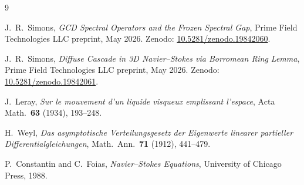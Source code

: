 \documentclass[12pt]{amsart}
\theoremstyle{definition}
\begin{document}
\begin{thebibliography}{9}

J.~R.~Simons,
\textit{GCD Spectral Operators and the Frozen Spectral Gap},
Prime Field Technologies LLC preprint, May 2026.
Zenodo: \href{https://doi.org/10.5281/zenodo.19842060}{10.5281/zenodo.19842060}.

J.~R.~Simons,
\textit{Diffuse Cascade in 3D Navier--Stokes via Borromean Ring Lemma},
Prime Field Technologies LLC preprint, May 2026.
Zenodo: \href{https://doi.org/10.5281/zenodo.19842061}{10.5281/zenodo.19842061}.

J.~Leray,
\textit{Sur le mouvement d'un liquide visqueux emplissant l'espace},
Acta Math.\ \textbf{63} (1934), 193--248.

H.~Weyl,
\textit{Das asymptotische Verteilungsgesetz der Eigenwerte linearer
partieller Differentialgleichungen},
Math.\ Ann.\ \textbf{71} (1912), 441--479.

P.~Constantin and C.~Foias,
\textit{Navier--Stokes Equations},
University of Chicago Press, 1988.

\end{thebibliography}
\end{document}
